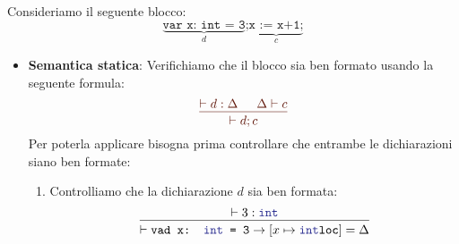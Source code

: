 \documentclass[a4paper]{article}
\begin{document}
\begin{example}
  \newcommand\ruleCol{Sepia}
  Consideriamo il seguente blocco:
  \[
    \underbrace{\texttt{var x: int = 3}}_{d}
    \texttt{;}
    \underbrace{\texttt{x := x+1;}}_{c}
  \] 
  \begin{itemize}
    \item \textbf{Semantica statica}: Verifichiamo che il blocco
      sia ben formato usando la seguente formula:
      \begin{equation}
        \color{\ruleCol}
        \begin{prooftree}
          \hypo{ 
            \vdash d : \Delta
          }
          \hypo{ 
            \Delta \vdash c
          }
          \infer2{ 
            \vdash d;c
          }
        \end{prooftree}
        \label{eq:regola_dichiarazione_ben_formata}
      \end{equation}
      Per poterla applicare bisogna prima controllare che entrambe le dichiarazioni
      siano ben formate:
      \begin{enumerate}
        \item Controlliamo che la dichiarazione \( d \) sia ben formata:
          \[
            \begin{prooftree}
              \hypo{ 
                \vdash 3 : \texttt{\textcolor{Blue}{int}}
              }
              \infer1{ 
                \vdash \texttt{vad x: \textcolor{Blue}{int} = 3}
                \to \left[ x \mapsto \texttt{\textcolor{Blue}{int}loc} \right]
                = \Delta
              }
            \end{prooftree}
          \] 


\end{enumerate}
\end{itemize}
\end{example}
\end{document}
